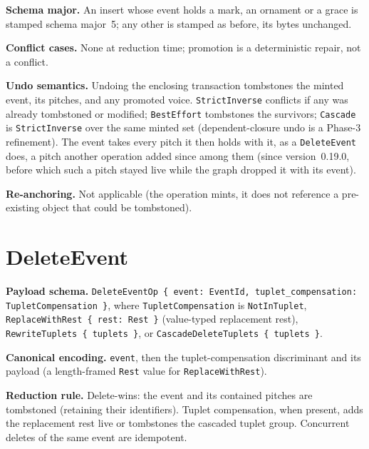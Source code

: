 \documentclass[11pt,letterpaper]{report}
\begin{document}
\textbf{Schema major.} An insert whose event holds a mark, an ornament or a
grace is stamped schema major~5; any other is stamped as before, its bytes
unchanged.

\textbf{Conflict cases.} None at reduction time; promotion is a deterministic
repair, not a conflict.

\textbf{Undo semantics.} Undoing the enclosing transaction tombstones the minted
event, its pitches, and any promoted voice. \texttt{StrictInverse} conflicts if
any was already tombstoned or modified; \texttt{BestEffort} tombstones the
survivors; \texttt{Cascade} is \texttt{StrictInverse} over the same minted set
(dependent-closure undo is a Phase-3 refinement). The event takes every pitch
it then holds with it, as a \texttt{DeleteEvent} does, a pitch another
operation added since among them (since version~0.19.0, before which such a
pitch stayed live while the graph dropped it with its event).

\textbf{Re-anchoring.} Not applicable (the operation mints, it does not
reference a pre-existing object that could be tombstoned).

\section{DeleteEvent}
\label{sec:k0:delete-event}

\textbf{Payload schema.} \texttt{DeleteEventOp \{ event: EventId,
tuplet\_compensation: TupletCompensation \}}, where \texttt{TupletCompensation}
is \texttt{NotInTuplet}, \texttt{ReplaceWithRest \{ rest: Rest \}} (value-typed
replacement rest), \texttt{RewriteTuplets \{ tuplets \}}, or
\texttt{CascadeDeleteTuplets \{ tuplets \}}.

\textbf{Canonical encoding.} \texttt{event}, then the tuplet-compensation
discriminant and its payload (a length-framed \texttt{Rest} value for
\texttt{ReplaceWithRest}).

\textbf{Reduction rule.} Delete-wins: the event and its contained pitches are
tombstoned (retaining their identifiers). Tuplet compensation, when present, adds
the replacement rest live or tombstones the cascaded tuplet group. Concurrent
deletes of the same event are idempotent.
\end{document}

